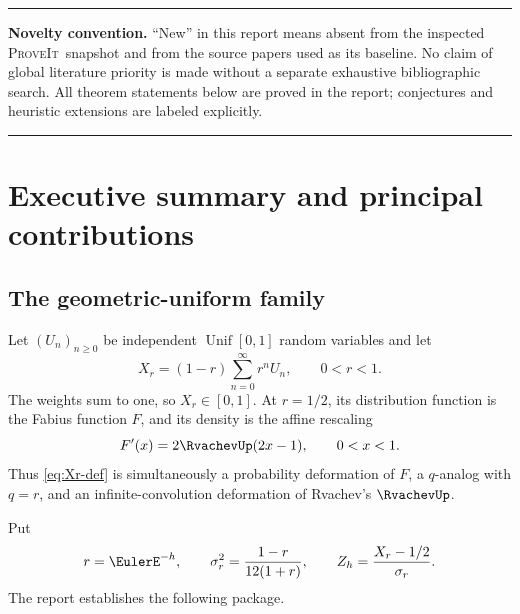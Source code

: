 \documentclass[11pt]{article}
\numberwithin{equation}{section}
\theoremstyle{definition}
\newcommand{\repo}{\textsc{ProveIt}}
\newenvironment{cautionbox}{%
  \begin{center}\begin{minipage}{0.94\textwidth}%
  \setlength{\parindent}{0pt}\color{accent}\hrule\vspace{0.55em}\color{black}%
}{%
  \vspace{0.55em}\color{accent}\hrule\color{black}%
  \end{minipage}\end{center}%
}
\begin{document}
\begin{cautionbox}
\textbf{Novelty convention.}  ``New'' in this report means absent from the inspected \repo\ snapshot and from the source papers used as its baseline.  No claim of global literature priority is made without a separate exhaustive bibliographic search.  All theorem statements below are proved in the report; conjectures and heuristic extensions are labeled explicitly.
\end{cautionbox}

\tableofcontents
\clearpage

\section{Executive summary and principal contributions}

\subsection{The geometric-uniform family}
Let \((U_n)_{n\ge0}\) be independent \(\operatorname{Unif}[0,1]\) random variables and let
\begin{equation}\label{eq:Xr-def}
 X_r=(1-r)\sum_{n=0}^{\infty}r^nU_n,
 \qquad 0<r<1.
\end{equation}
The weights sum to one, so \(X_r\in[0,1]\).  At \(r=1/2\), its distribution function is the Fabius function \(F\), and its density is the affine rescaling \cite{Fabius1966,Arias1982,RepoPrimary}
\begin{equation}\label{eq:fabius-density-up}
 F'(x)=2\RvachevUp(2x-1),\qquad 0<x<1.
\end{equation}
Thus \eqref{eq:Xr-def} is simultaneously a probability deformation of \(F\), a \(q\)-analog with \(q=r\), and an infinite-convolution deformation of Rvachev's \(\RvachevUp\).

Put
\begin{equation}\label{eq:h-r-sigma-Z}
 r=\EulerE^{-h},\qquad
 \sigma_r^2=\frac{1-r}{12(1+r)},\qquad
 Z_h=\frac{X_r-1/2}{\sigma_r}.
\end{equation}
The report establishes the following package.
\end{document}
